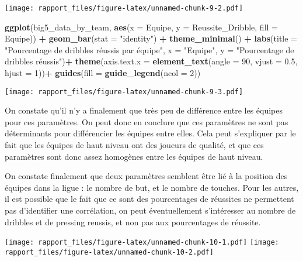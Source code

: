 \documentclass[
]{article}
\newenvironment{Shaded}{\begin{snugshade}}{\end{snugshade}}
\newcommand{\AttributeTok}[1]{\textcolor[rgb]{0.13,0.29,0.53}{#1}}
\newcommand{\DecValTok}[1]{\textcolor[rgb]{0.00,0.00,0.81}{#1}}
\newcommand{\FloatTok}[1]{\textcolor[rgb]{0.00,0.00,0.81}{#1}}
\newcommand{\FunctionTok}[1]{\textcolor[rgb]{0.13,0.29,0.53}{\textbf{#1}}}
\newcommand{\NormalTok}[1]{#1}
\newcommand{\SpecialCharTok}[1]{\textcolor[rgb]{0.81,0.36,0.00}{\textbf{#1}}}
\newcommand{\StringTok}[1]{\textcolor[rgb]{0.31,0.60,0.02}{#1}}
\begin{document}
\texttt{[image: rapport\_files/figure-latex/unnamed-chunk-9-2.pdf]}

\begin{Shaded}
\begin{Highlighting}[]
\FunctionTok{ggplot}\NormalTok{(big5\_data\_by\_team, }\FunctionTok{aes}\NormalTok{(}\AttributeTok{x =}\NormalTok{ Equipe, }\AttributeTok{y =}\NormalTok{ Reussite\_Dribble, }\AttributeTok{fill =}\NormalTok{ Equipe)) }\SpecialCharTok{+} \FunctionTok{geom\_bar}\NormalTok{(}\AttributeTok{stat =} \StringTok{"identity"}\NormalTok{) }\SpecialCharTok{+} \FunctionTok{theme\_minimal}\NormalTok{() }\SpecialCharTok{+} \FunctionTok{labs}\NormalTok{(}\AttributeTok{title =} \StringTok{"Pourcentage de dribbles réussis par équipe"}\NormalTok{, }\AttributeTok{x =} \StringTok{"Equipe"}\NormalTok{, }\AttributeTok{y =} \StringTok{"Pourcentage de dribbles réussis"}\NormalTok{)}\SpecialCharTok{+}  \FunctionTok{theme}\NormalTok{(}\AttributeTok{axis.text.x =} \FunctionTok{element\_text}\NormalTok{(}\AttributeTok{angle =} \DecValTok{90}\NormalTok{, }\AttributeTok{vjust =} \FloatTok{0.5}\NormalTok{, }\AttributeTok{hjust =} \DecValTok{1}\NormalTok{))}\SpecialCharTok{+}
  \FunctionTok{guides}\NormalTok{(}\AttributeTok{fill =} \FunctionTok{guide\_legend}\NormalTok{(}\AttributeTok{ncol =} \DecValTok{2}\NormalTok{))}
\end{Highlighting}
\end{Shaded}

\texttt{[image: rapport\_files/figure-latex/unnamed-chunk-9-3.pdf]}

On constate qu'il n'y a finalement que très peu de différence entre les
équipes pour ces paramètres. On peut donc en conclure que ces paramètres
ne sont pas déterminants pour différencier les équipes entre elles. Cela
peut s'expliquer par le fait que les équipes de haut niveau ont des
joueurs de qualité, et que ces paramètres sont donc assez homogènes
entre les équipes de haut niveau.

On constate finalement que deux paramètres semblent être lié à la
position des équipes dans la ligue : le nombre de but, et le nombre de
touches. Pour les autres, il est possible que le fait que ce sont des
pourcentages de réussites ne permettent pas d'identifier une
corrélation, on peut éventuellement s'intéresser au nombre de dribbles
et de pressing reussis, et non pas aux pourcentages de réussite.

\texttt{[image: rapport\_files/figure-latex/unnamed-chunk-10-1.pdf]}
\texttt{[image: rapport\_files/figure-latex/unnamed-chunk-10-2.pdf]}
\end{document}
